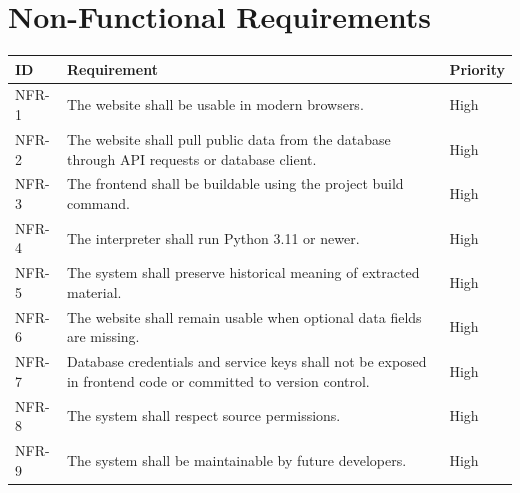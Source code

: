 \section{Non-Functional Requirements}

\begin{longtable}{|p{}|p{}|p{}|}
	\hline
	\textbf{ID} & \textbf{Requirement}                                                                                         & \textbf{Priority} \\
	\hline
	NFR-1       & The website shall be usable in modern browsers.                                                              & High              \\
	\hline
	NFR-2       & The website shall pull public data from the database through API requests or database client.                & High              \\
	\hline
	NFR-3       & The frontend shall be buildable using the project build command.                                             & High              \\
	\hline
	NFR-4       & The interpreter shall run Python 3.11 or newer.                                                              & High              \\
	\hline
	NFR-5       & The system shall preserve historical meaning of extracted material.                                          & High              \\
	\hline
	NFR-6       & The website shall remain usable when optional data fields are missing.                                       & High              \\
	\hline
	NFR-7       & Database credentials and service keys shall not be exposed in frontend code or committed to version control. & High              \\
	\hline
	NFR-8       & The system shall respect source permissions.                                                                 & High              \\
	\hline
	NFR-9       & The system shall be maintainable by future developers.                                                       & High              \\
	\hline
\end{longtable}
